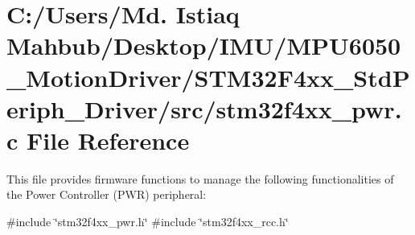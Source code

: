 \section{C\+:/\+Users/\+Md. Istiaq Mahbub/\+Desktop/\+I\+M\+U/\+M\+P\+U6050\+\_\+\+Motion\+Driver/\+S\+T\+M32\+F4xx\+\_\+\+Std\+Periph\+\_\+\+Driver/src/stm32f4xx\+\_\+pwr.c File Reference}
\label{stm32f4xx__pwr_8c}


This file provides firmware functions to manage the following functionalities of the Power Controller (P\+WR) peripheral\+:  


{\ttfamily \#include \char`\"{}stm32f4xx\+\_\+pwr.\+h\char`\"{}}\newline
{\ttfamily \#include \char`\"{}stm32f4xx\+\_\+rcc.\+h\char`\"{}}\newline
